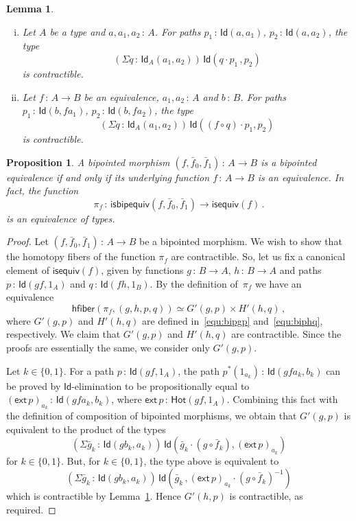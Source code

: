 \documentclass[10pt,a4paper,oneside,reqno]{amsart}
\numberwithin{equation}{section}
\theoremstyle{mythm}
\newtheorem{lemma}[theorem]{Lemma}
\newtheorem{proposition}[theorem]{Proposition}
\theoremstyle{mydef}
\theoremstyle{myrmk}
\newcommand{\co}{\,{:}\,}
\newcommand{\ct}{\cdot}
\newcommand{\hfiber}{\mathsf{hfiber}}
\newcommand{\isequiv}{\mathsf{isequiv}}
\newcommand{\Hot}{\mathsf{Hot}}
\newcommand{\ext}{\mathsf{ext}}
\newcommand{\Id}{\mathsf{Id}}
\newcommand{\isbipequiv}{\mathsf{isbipequiv}}
\begin{document}
\begin{lemma} \hfill \label{thm:useful}
\begin{enumerate}[(i)]
\item Let $A$ be a type and $a, a_1, a_2 \co A$. For paths $p_1 \co \Id(a,a_1)$, $p_2 \co \Id(a,a_2)$, the type 
\[
(\Sigma q \co \Id_A(a_1,a_2)) \, \Id( q \ct p_1 \, , p_2)
\] 
is contractible. 
\item Let $f \co A \to B$ be an equivalence, $a_1, a_2 \co A$ and $b \co B$. For paths $p_1 \co \Id(b, f a_1)$, 
$p_2 \co \Id(b, fa_2)$, the type 
\[
(\Sigma q \co \Id_A(a_1,a_2)) \, \Id( (f \circ q) \ct p_1 , p_2)
\] 
is contractible.
\end{enumerate}
\end{lemma}




\begin{proposition}  \label{thm:usemere}  A bipointed morphism $(f, \bar{f}_0, \bar{f}_1) \co A \to B$ is a bipointed equivalence if and only
if its underlying function $f \co A \to B$ is an equivalence. In fact,  the  function
\[
\pi_f \co \isbipequiv(f, \bar{f}_0, \bar{f}_1)  \to \isequiv(f) \, .
\]
is an equivalence of types. 
\end{proposition}  

\begin{proof}
Let  $(f, \bar{f}_0, \bar{f}_1) \co A \to B$ be a bipointed morphism. We wish to show that the homotopy fibers
of the function $\pi_f$ are contractible. So, let us fix a canonical element of $\isequiv(f)$, given by functions $g \co B
\to A$, $h \co B \to A$ and paths $p \co \Id(gf, 1_A)$ and $q \co \Id(fh, 1_B)$. By the definition of~$\pi_f$ we have
an equivalence 
\[
\hfiber(\pi_f, (g,h, p, q)) \simeq G'(g,p) \times H'(h,q) \, ,
\]
 where $G'(g,p)$ and $H'(h,q)$ are defined
in~\eqref{equ:bipgp} and~\eqref{equ:biphq}, respectively. 
We claim that $G'(g,p)$ and $H'(h,q)$ are contractible. Since
the proofs are essentially the same, we consider only $G'(g,p)$.  

Let $k \in \{0, 1 \}$. For a path $p \co \Id(gf, 1_A)$, the path $p^*(1_{a_k}) \co \Id( gf a_k, b_k)$ can be proved by $\Id$-elimination to be propositionally equal to $(\ext \, p)_{a_k}\co \Id(gfa_k, b_k)$, where $\ext \, p \co \Hot(gf, 1_A)$. Combining this fact with the definition of composition of bipointed morphisms, we obtain that
$G'(g,p)$ is equivalent to the product of the types
\[
(\Sigma \bar{g}_k \co \Id( gb_k, a_k)) \, \Id ( \bar{g}_k \ct (g \circ \bar{f}_k), (\ext \, p)_{a_k})
\]
for $k \in \{0, 1 \}$. But, for $k \in \{ 0, 1 \}$, the type above is equivalent to 
\[
(\Sigma \bar{g}_k \co \Id( gb_k, a_k)) \, \Id ( \bar{g}_k \, , ( \ext \, p)_{a_k} \ct  (g \circ \bar{f}_k)^{-1} )
\]
which is contractible by Lemma~\ref{thm:useful}. Hence $G'(h,p)$ is contractible, as required.
\end{proof}
\end{document}

